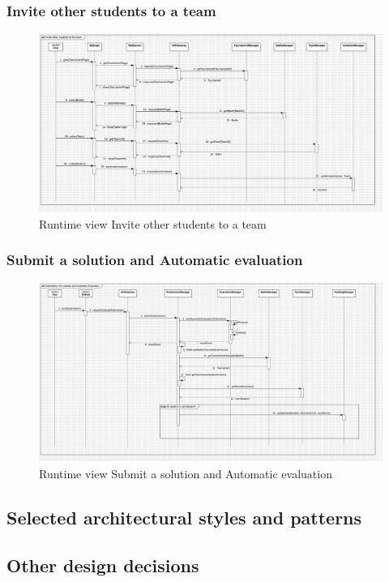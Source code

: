 \subsubsection*{Invite other students to a team}
\begin{figure}[H]
    \centering
    \includegraphics[width=\textwidth]{Diagrams/InviteStudentSD.jpg}
    \caption{Runtime view Invite other students to a team}
    \label{fig:runtime_view_invite_student}
\end{figure}

\subsubsection*{Submit a solution and Automatic evaluation}
\begin{figure}[H]
    \centering
    \includegraphics[width=\textwidth]{Diagrams/SolutionSubmissionSD.jpg}
    \caption{Runtime view Submit a solution and Automatic evaluation}
    \label{fig:runtime_view_submit_solution}
\end{figure}
\clearpage
\subsection{Selected architectural styles and patterns}
\subsection{Other design decisions}
